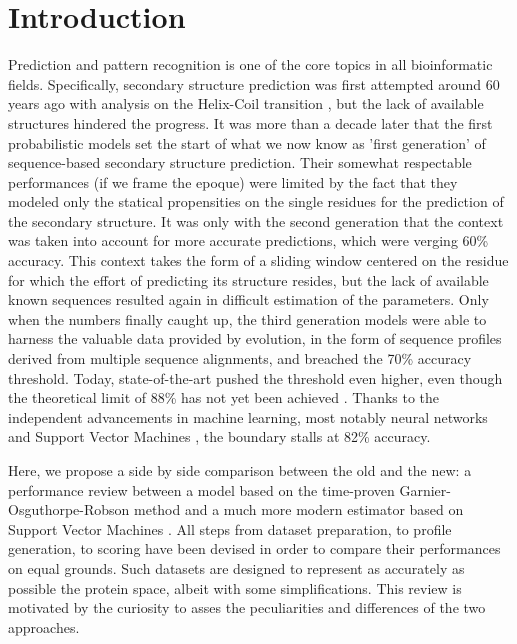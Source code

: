 \documentclass[nocrop]{bioinfo}
\begin{document}
\section{Introduction}
Prediction and pattern recognition is one of the core topics in all bioinformatic fields.
Specifically, secondary structure prediction was first attempted around 60 years ago with analysis on the Helix-Coil transition \citep{Zimm1959} \citep{Lifson1961}, but the lack of available structures hindered the progress.
It was more than a decade later that the first probabilistic models set the start of what we now know as 'first generation' of sequence-based secondary structure prediction.
Their somewhat respectable performances (if we frame the epoque) were limited by the fact that they modeled only the statical propensities on the single residues for the prediction of the secondary structure.
It was only with the second generation that the context \citep{Garnier1978} was taken into account for more accurate predictions, which were verging 60\% accuracy.
This context takes the form of a sliding window centered on the residue for which the effort of predicting its structure resides, but the lack of available known sequences resulted again in difficult estimation of the parameters.
Only when the numbers finally caught up, the third generation models were able to harness the valuable data provided by evolution, in the form of sequence profiles derived from multiple sequence alignments, and breached the 70\% accuracy threshold.
Today, state-of-the-art pushed the threshold even higher, even though the theoretical limit of 88\% has not yet been achieved \citep{Rost2001}\citep{Russell1993}.
Thanks to the independent advancements in machine learning, most notably neural networks \citep{Drozdetskiy2015}\citep{Heffernan2018} and Support Vector Machines \citep{Kieslich2016}, the boundary stalls at 82\% accuracy.

Here, we propose a side by side comparison between the old and the new: a performance review between a model based on the time-proven Garnier-Osguthorpe-Robson method \citep{Garnier1978} and a much more modern estimator based on Support Vector Machines \citep{Cortes1995}.
All steps from dataset preparation, to profile generation, to scoring have been devised in order to compare their performances on equal grounds. 
Such datasets are designed to represent as accurately as possible the protein space, albeit with some simplifications.
This review is motivated by the curiosity to asses the peculiarities and differences of the two approaches. 
\end{document}
